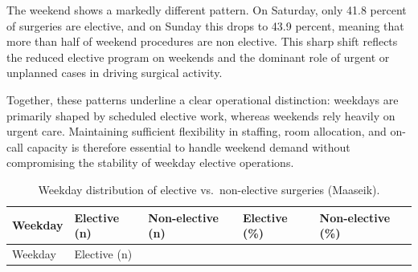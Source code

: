 \documentclass[
]{article}
\begin{document}
The weekend shows a markedly different pattern. On Saturday, only 41.8
percent of surgeries are elective, and on Sunday this drops to 43.9
percent, meaning that more than half of weekend procedures are non
elective. This sharp shift reflects the reduced elective program on
weekends and the dominant role of urgent or unplanned cases in driving
surgical activity.

Together, these patterns underline a clear operational distinction:
weekdays are primarily shaped by scheduled elective work, whereas
weekends rely heavily on urgent care. Maintaining sufficient flexibility
in staffing, room allocation, and on-call capacity is therefore
essential to handle weekend demand without compromising the stability of
weekday elective operations.

\begin{longtable}[]{@{}
  >{\centering\arraybackslash}p{}
  >{\centering\arraybackslash}p{}
  >{\centering\arraybackslash}p{}
  >{\centering\arraybackslash}p{}
  >{\centering\arraybackslash}p{}@{}}
\caption{Weekday distribution of elective vs.~non-elective surgeries
(Maaseik). \label{tab:urgency_wd}}\tabularnewline
\toprule\noalign{}
\begin{minipage}[b]{\linewidth}\centering
Weekday
\end{minipage} & \begin{minipage}[b]{\linewidth}\centering
Elective (n)
\end{minipage} & \begin{minipage}[b]{\linewidth}\centering
Non-elective (n)
\end{minipage} & \begin{minipage}[b]{\linewidth}\centering
Elective (\%)
\end{minipage} & \begin{minipage}[b]{\linewidth}\centering
Non-elective (\%)
\end{minipage} \\
\midrule\noalign{}
\endfirsthead
\toprule\noalign{}
\begin{minipage}[b]{\linewidth}\centering
Weekday
\end{minipage} & \begin{minipage}[b]{\linewidth}\centering
Elective (n)
\end{minipage} & \begin{minipage}[b]{\linewidth}\centering

\end{minipage}
\end{longtable}
\end{document}
